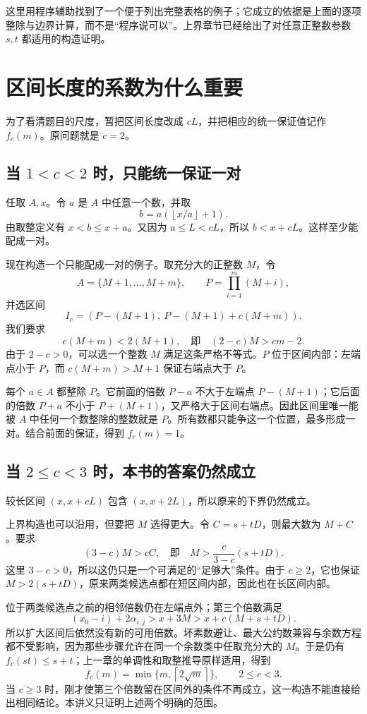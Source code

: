 \documentclass[UTF8,a4paper,oneside,openany,fontset=fandol,zihao=-4]{ctexbook}
\theoremstyle{guide}
\newcommand{\ceil}[1]{\left\lceil#1\right\rceil}
\newcommand{\floor}[1]{\left\lfloor#1\right\rfloor}
\begin{document}
这里用程序辅助找到了一个便于列出完整表格的例子；它成立的依据是上面的逐项整除与边界计算，而不是“程序说可以”。上界章节已经给出了对任意正整数参数 $s,t$ 都适用的构造证明。

\section{区间长度的系数为什么重要}
为了看清题目的尺度，暂把区间长度改成 $cL$，并把相应的统一保证值记作 $f_c(m)$。原问题就是 $c=2$。

\subsection{\texorpdfstring{当 $1<c<2$ 时，只能统一保证一对}{当 1<c<2 时，只能统一保证一对}}
任取 $A,x$。令 $a$ 是 $A$ 中任意一个数，并取
\[
b=a\left(\floor{x/a}+1\right).
\]
由取整定义有 $x<b\le x+a$。又因为 $a\le L<cL$，所以 $b<x+cL$。这样至少能配成一对。

现在构造一个只能配成一对的例子。取充分大的正整数 $M$，令
\[
A=\{M+1,\ldots,M+m\},\qquad
P=\prod_{i=1}^m(M+i),
\]
并选区间
\[
I_c=(P-(M+1),\ P-(M+1)+c(M+m)).
\]
我们要求
\[
c(M+m)<2(M+1),
\quad\text{即}\quad (2-c)M>cm-2.
\]
由于 $2-c>0$，可以选一个整数 $M$ 满足这条严格不等式。$P$ 位于区间内部：左端点小于 $P$，而 $c(M+m)>M+1$ 保证右端点大于 $P$。

每个 $a\in A$ 都整除 $P$。它前面的倍数 $P-a$ 不大于左端点 $P-(M+1)$；它后面的倍数 $P+a$ 不小于 $P+(M+1)$，又严格大于区间右端点。因此区间里唯一能被 $A$ 中任何一个数整除的整数就是 $P$。所有数都只能争这一个位置，最多形成一对。结合前面的保证，得到 $f_c(m)=1$。

\subsection{\texorpdfstring{当 $2\le c<3$ 时，本书的答案仍然成立}{当 2≤c<3 时，本书的答案仍然成立}}
较长区间 $(x,x+cL)$ 包含 $(x,x+2L)$，所以原来的下界仍然成立。

上界构造也可以沿用，但要把 $M$ 选得更大。令 $C=s+tD$，则最大数为 $M+C$。要求
\[
(3-c)M>cC,
\quad\text{即}\quad M>\frac{c}{3-c}(s+tD).
\]
这里 $3-c>0$，所以这仍只是一个可满足的“足够大”条件。由于 $c\ge2$，它也保证 $M>2(s+tD)$，原来两类候选点都在短区间内部，因此也在长区间内部。

位于两类候选点之前的相邻倍数仍在左端点外；第三个倍数满足
\[
(x_0-i)+2\alpha_{i,j}>x+3M
>x+c(M+s+tD).
\]
所以扩大区间后依然没有新的可用倍数。坏素数避让、最大公约数兼容与余数方程都不受影响，因为那些步骤允许在同一个余数类中任取充分大的 $M$。于是仍有 $f_c(st)\le s+t$；上一章的单调性和取整推导原样适用，得到
\[
f_c(m)=\min\{m,\ceil{2\sqrt m}\},\qquad 2\le c<3.
\]
当 $c\ge3$ 时，刚才使第三个倍数留在区间外的条件不再成立，这一构造不能直接给出相同结论。本讲义只证明上述两个明确的范围。
\end{document}
